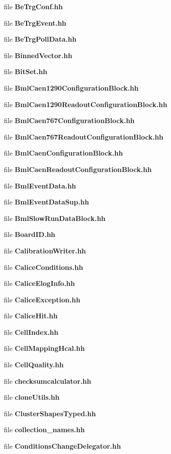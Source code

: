 \begin{DoxyCompactItemize}
\item 
file {\bfseries Be\-Trg\-Conf.\-hh}
\item 
file {\bfseries Be\-Trg\-Event.\-hh}
\item 
file {\bfseries Be\-Trg\-Poll\-Data.\-hh}
\item 
file {\bfseries Binned\-Vector.\-hh}
\item 
file {\bfseries Bit\-Set.\-hh}
\item 
file {\bfseries Bml\-Caen1290\-Configuration\-Block.\-hh}
\item 
file {\bfseries Bml\-Caen1290\-Readout\-Configuration\-Block.\-hh}
\item 
file {\bfseries Bml\-Caen767\-Configuration\-Block.\-hh}
\item 
file {\bfseries Bml\-Caen767\-Readout\-Configuration\-Block.\-hh}
\item 
file {\bfseries Bml\-Caen\-Configuration\-Block.\-hh}
\item 
file {\bfseries Bml\-Caen\-Readout\-Configuration\-Block.\-hh}
\item 
file {\bfseries Bml\-Event\-Data.\-hh}
\item 
file {\bfseries Bml\-Event\-Data\-Sup.\-hh}
\item 
file {\bfseries Bml\-Slow\-Run\-Data\-Block.\-hh}
\item 
file {\bfseries Board\-I\-D.\-hh}
\item 
file {\bfseries Calibration\-Writer.\-hh}
\item 
file {\bfseries Calice\-Conditions.\-hh}
\item 
file {\bfseries Calice\-Elog\-Info.\-hh}
\item 
file {\bfseries Calice\-Exception.\-hh}
\item 
file {\bfseries Calice\-Hit.\-hh}
\item 
file {\bfseries Cell\-Index.\-hh}
\item 
file {\bfseries Cell\-Mapping\-Hcal.\-hh}
\item 
file {\bfseries Cell\-Quality.\-hh}
\item 
file {\bfseries checksumcalculator.\-hh}
\item 
file {\bfseries clone\-Utils.\-hh}
\item 
file {\bfseries Cluster\-Shapes\-Typed.\-hh}
\item 
file {\bfseries collection\-\_\-names.\-hh}
\item 
file {\bfseries Conditions\-Change\-Delegator.\-hh}
\item 

\end{DoxyCompactItemize}
